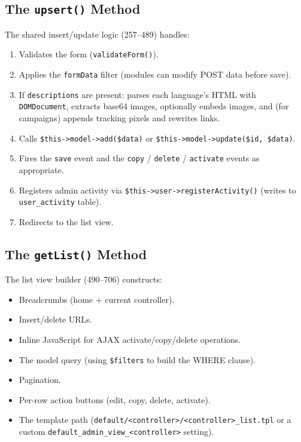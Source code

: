 \documentclass[11pt,a4paper]{article}
\begin{document}
\subsection{The \texttt{upsert()} Method}

The shared insert/update logic (257--489) handles:

\begin{enumerate}[leftmargin=1.6em,itemsep=2pt]
  \item Validates the form (\texttt{validateForm()}).
  \item Applies the \texttt{formData} filter (modules can modify POST
        data before save).
  \item If \texttt{descriptions} are present: parses each
        language's HTML with \texttt{DOMDocument}, extracts base64
        images, optionally embeds images, and (for campaigns) appends
        tracking pixels and rewrites links.
  \item Calls \texttt{\$this->model->add(\$data)} or
        \texttt{\$this->model->update(\$id, \$data)}.
  \item Fires the \texttt{save} event and the \texttt{copy} /
        \texttt{delete} / \texttt{activate} events as appropriate.
  \item Registers admin activity via
        \texttt{\$this->user->registerActivity()} (writes to
        \texttt{user\_activity} table).
  \item Redirects to the list view.
\end{enumerate}

\subsection{The \texttt{getList()} Method}

The list view builder (490--706) constructs:

\begin{itemize}[leftmargin=1.6em,itemsep=2pt]
  \item Breadcrumbs (home + current controller).
  \item Insert/delete URLs.
  \item Inline JavaScript for AJAX activate/copy/delete operations.
  \item The model query (using \texttt{\$filters} to build the WHERE
        clause).
  \item Pagination.
  \item Per-row action buttons (edit, copy, delete, activate).
  \item The template path (\texttt{default/<controller>/<controller>\_list.tpl}
        or a custom \texttt{default\_admin\_view\_<controller>} setting).
\end{itemize}
\end{document}
